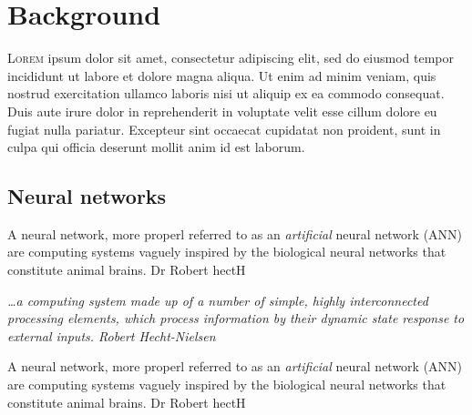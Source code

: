 

\chapter{Background}



\lettrine{L}{orem} ipsum dolor sit amet, consectetur
adipiscing elit, sed do eiusmod tempor incididunt ut labore et dolore magna
aliqua. Ut enim ad minim veniam, quis nostrud exercitation ullamco laboris nisi
ut aliquip ex ea commodo consequat. Duis aute irure dolor in reprehenderit in
voluptate velit esse cillum dolore eu fugiat nulla pariatur. Excepteur sint
occaecat cupidatat non proident, sunt in culpa qui officia deserunt mollit anim
id est laborum.


\section{Neural networks}

A neural network, more properl referred to as an \textit{artificial} neural
network (ANN) are computing systems vaguely inspired by the biological neural
networks that constitute animal brains. Dr Robert hectH


\begin{quoteBox}
  \itshape
  \ldots a computing system made up of a number of simple, highly interconnected
  processing elements, which process information by their dynamic state response
  to external inputs.
  \tcblower
  \hfill \textup{Robert Hecht-Nielsen}
\end{quoteBox}

A neural network, more properl referred to as an \textit{artificial} neural
network (ANN) are computing systems vaguely inspired by the biological neural
networks that constitute animal brains. Dr Robert hectH

